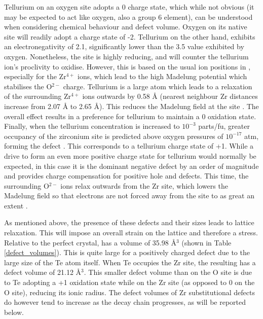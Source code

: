 Tellurium on an oxygen site adopts a 0 charge state, which while not obvious (it may be expected to act like oxygen, also a group 6 element), can be understood when considering chemical behaviour and defect volume. Oxygen on its native site will readily adopt a charge state of -2. Tellurium on the other hand, exhibits an electronegativity of 2.1, significantly lower than the 3.5 value exhibited by oxygen. Nonetheless, the  site is highly reducing, and will counter the tellurium ion's proclivity to oxidise. However, this is based on the usual ion positions in \zirconia , especially for the Zr$^{4+}$ ions, which lead to the high Madelung potential which stabilises the O$^{2-}$ charge. Tellurium is a large atom which leads to a relaxation of the surrounding Zr$^{4+}$ ions outwards by 0.58 \r{A} (nearest neighbour Zr distances increase from 2.07 \r{A} to 2.65 \r{A}). This reduces the Madelung field at the site \cite{Grimes1990}. The overall effect results in a preference for tellurium to maintain a 0 oxidation state. Finally, when the tellurium concentration is increased to $10^{-3}$ parts/fu, greater occupancy of the zirconium site is predicted above oxygen pressures of $10^{-17}$ atm, forming the defect . This corresponds to a tellurium charge state of +1. While a drive to form an even more positive charge state for tellurium would normally be expected, in this case it is the dominant negative defect by an order of magnitude and provides charge compensation for positive hole and  defects. This time, the surrounding O$^{2-}$ ions relax outwards from the Zr site, which lowers the Madelung field so that electrons are not forced away from the site to as great an extent \cite{Grimes1990}.

As mentioned above, the presence of these defects and their sizes leads to lattice relaxation. This will impose an overall strain on the lattice and therefore a stress. Relative to the perfect crystal,  has a volume of 35.98 \r{A}$^{3}$ (shown in Table \ref{defect_volumes}). This is quite large for a positively charged defect due to the large size of the Te atom itself. When Te occupies the Zr site, the resulting  has a defect volume of 21.12 \r{A}$^{3}$. This smaller defect volume than on the O site is due to Te adopting a +1 oxidation state while on the Zr site (as opposed to 0 on the O site), reducing its ionic radius. The defect volumes of Zr substitutional defects do however tend to increase as the decay chain progresses, as will be reported below.

